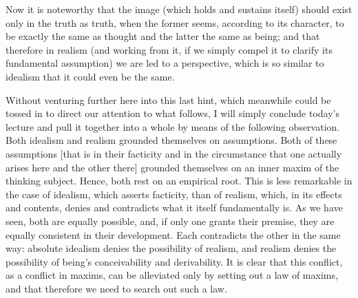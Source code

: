 Now it is noteworthy that the image
(which holds and sustains itself)
should exist only in the truth as truth,
when the former seems, according to its character,
to be exactly the same as thought
and the latter the same as being;
and that therefore in realism
(and working from it, if we simply compel it
to clarify its fundamental assumption)
we are led to a perspective,
which is so similar to idealism
that it could even be the same.

Without venturing further here into this last hint,
which meanwhile could be tossed in
to direct our attention to what follows,
I will simply conclude today’s lecture
and pull it together into a whole
by means of the following observation.
Both idealism and realism grounded themselves on assumptions.
Both of these assumptions
[that is in their facticity and in the circumstance
that one actually arises here and the other there]
grounded themselves on an inner maxim of the thinking subject.
Hence, both rest on an empirical root.
This is less remarkable in the case of idealism,
which asserts facticity, than of realism,
which, in its effects and contents,
denies and contradicts what it itself fundamentally is.
As we have seen, both are equally possible,
and, if only one grants their premise,
they are equally consistent in their development.
Each contradicts the other in the same way:
absolute idealism denies the possibility of realism,
and realism denies the possibility of
being’s conceivability and derivability.
It is clear that this conflict,
as a conflict in maxims, can be alleviated
only by setting out a law of maxims,
and that therefore we need to search out such a law.

